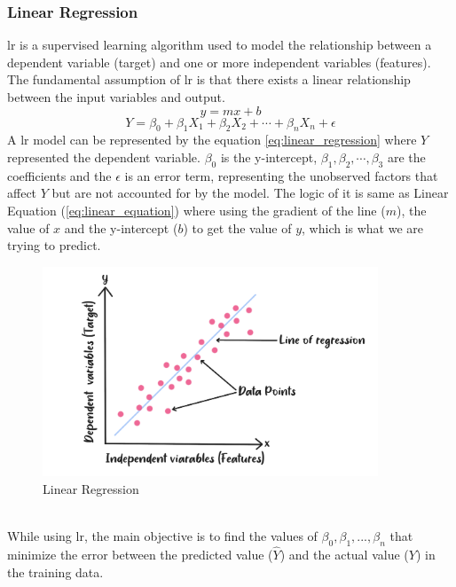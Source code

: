 \subsubsection{Linear Regression}
\nocite{mali_2021_linear}
\nocite{rohithgandhi_2018_introduction}
\nocite{kwiatkowski_2021_gradient,ibm_what}
\nocite{_2019_descending}
\gls{lr} is a supervised learning algorithm used to model the relationship between a dependent variable (target) and one or more independent variables (features).
The fundamental assumption of \gls{lr} is that there exists a linear relationship between the input variables and output. \citep{ibm_2022_about}
\begin{equation} \label{eq:linear_equation}
    y = mx + b
\end{equation}
\begin{equation} \label{eq:linear_regression}
    Y = \beta_0 + \beta_{1}X_{1} + \beta_{2}X_{2} + \cdots + \beta_{n}X_{n} + \epsilon
\end{equation}
\indent A \gls{lr} model can be represented by the equation \ref{eq:linear_regression} where $Y$ represented the dependent variable. 
$\beta_0$ is the y-intercept, $\beta_1, \beta_2, \cdots, \beta_3$ are the coefficients  and the $\epsilon$ is an error term, representing the unobserved factors that affect $Y$ but are not accounted for by the model.
The logic of it is same as Linear Equation (\ref{eq:linear_equation}) where using the gradient of the line ($m$), the value of $x$ and the y-intercept ($b$) to get the value of $y$, which is what we are trying to predict. 
\\
\begin{figure}[!ht]
    \centering
    \includegraphics[width=10cm]{Images/lr.png}
    \caption{Linear Regression}
    \label{fig:lr}
\end{figure}
\\
\indent While using \gls{lr}, the main objective is to find the values of $\beta_0, \beta_1,...,\beta_n$ that minimize the error between the predicted value ($\hat{Y}$) and the actual value ($Y$) in the training data.
